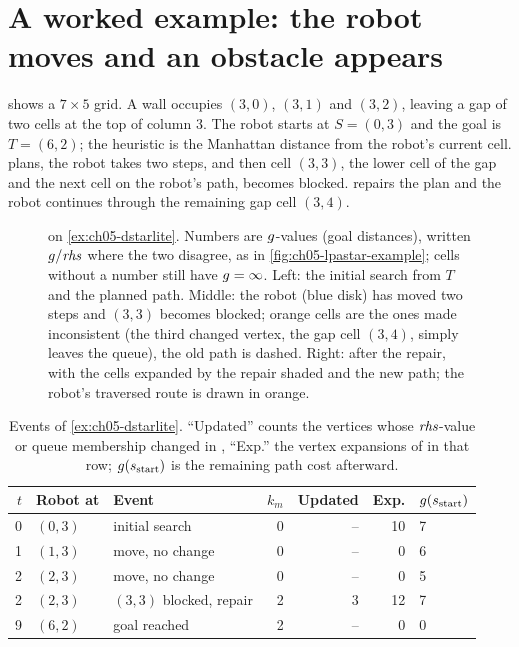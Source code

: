 \FloatBarrier
\section[A worked example: \dstarlite repairs a plan]{A worked example: the robot moves
and an obstacle appears}
\label{sec:ch05-dstarlite-example}

\begin{example}
\label{ex:ch05-dstarlite}
 shows a $7\times 5$ grid. A wall occupies
$(3,0)$, $(3,1)$ and $(3,2)$, leaving a gap of two cells at the top of column $3$. The
robot starts at $S=(0,3)$ and the goal is $T=(6,2)$; the heuristic is the Manhattan
distance from the robot's current cell. \dstarlite plans, the robot takes two steps,
and then cell $(3,3)$, the lower cell of the gap and the next cell on the robot's path,
becomes blocked. \dstarlite repairs the plan and the robot continues through the
remaining gap cell $(3,4)$.
\end{example}

\begin{figure}[tb]
  \centering
  \caption{\dstarlite on \cref{ex:ch05-dstarlite}. Numbers are $g$-values (goal
  distances), written $g/\mathit{rhs}$ where the two disagree, as in
  \cref{fig:ch05-lpastar-example}; cells without a number still have $g=\infty$. Left: the initial search from $T$ and the
  planned path. Middle: the robot (blue disk) has moved two steps and $(3,3)$ becomes
  blocked; orange cells are the ones \protect\DslUpdateVertex made inconsistent (the
  third changed vertex, the gap cell $(3,4)$, simply leaves the queue), the old path is
  dashed. Right: after the repair, with the cells expanded by the repair shaded and the
  new path; the robot's traversed route is drawn in orange.}
  \label{fig:ch05-dstarlite-example}
\end{figure}

\begin{table}[htbp]
  \centering\small
  \caption{Events of \cref{ex:ch05-dstarlite}. ``Updated'' counts the vertices whose
  $\mathit{rhs}$-value or queue membership changed in \protect\DslUpdateVertex, ``Exp.'' the vertex
  expansions of \protect\DslComputeShortestPath in that row; $g(s_{\mathrm{start}})$ is the
  remaining path cost afterward.}
  \label{tab:ch05-dstarlite-trace}
  \begin{tabular}{@{}rllrrrl@{}}
  \toprule
  $t$ & Robot at & Event & $k_m$ & Updated & Exp. & $g(s_{\mathrm{start}})$\\
  \midrule
  0 & $(0,3)$ & initial search & 0 & -- & 10 & 7\\
  1 & $(1,3)$ & move, no change & 0 & -- & 0 & 6\\
  2 & $(2,3)$ & move, no change & 0 & -- & 0 & 5\\
  2 & $(2,3)$ & $(3,3)$ blocked, repair & 2 & 3 & 12 & 7\\
  9 & $(6,2)$ & goal reached & 2 & -- & 0 & 0\\
  \bottomrule
  \end{tabular}
\end{table}

